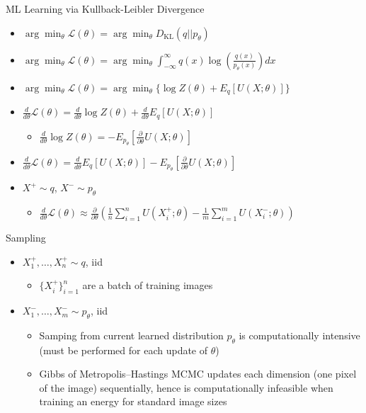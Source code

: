 \documentclass{beamer}
\begin{document}
\begin{frame}{ML Learning via Kullback-Leibler Divergence}
\begin{itemize}
\item $\arg\min_\theta\mathcal{L}(\theta)=\arg\min_\theta D_\text{KL}(q||p_\theta)$
\item $\arg\min_\theta\mathcal{L}(\theta)=\arg\min_\theta \int_{-\infty}^\infty q(x)\log(\frac{q(x)}{p_\theta(x)})dx$
\item $\arg\min_\theta\mathcal{L}(\theta)=\arg\min_\theta \{\log Z(\theta)+E_q[U(X;\theta)]\}$
\item $\frac{d}{d\theta}\mathcal{L}(\theta)=\frac{d}{d\theta}\log Z(\theta)+\frac{d}{d\theta}E_q[U(X;\theta)]$\begin{itemize}
\item $\frac{d}{d\theta}\log Z(\theta)=-E_{p_\theta}[\frac{\partial}{\partial\theta}U(X;\theta)]$\end{itemize}
\item $\frac{d}{d\theta}\mathcal{L}(\theta)=\frac{d}{d\theta}E_q[U(X;\theta)]-E_{p_\theta}[\frac{\partial}{\partial\theta}U(X;\theta)]$
\item $X^+\sim q$, $X^-\sim p_\theta$\begin{itemize}
\item $\frac{d}{d\theta}\mathcal{L}(\theta)\approx\frac{\partial}{\partial\theta}(\frac{1}{n}\sum_{i=1}^n U(X_i^+;\theta)-\frac{1}{m}\sum_{i=1}^m U(X_i^-;\theta))$\end{itemize}
\end{itemize}
\end{frame}
\begin{frame}{Sampling}
\begin{itemize}
\item $X_1^+,\dots,X_n^+\sim q$, iid
\begin{itemize}
\item $\{X_i^+\}_{i=1}^n$ are a batch of training images
\end{itemize}
\item $X_1^-,\dots,X_m^-\sim p_\theta$, iid
\begin{itemize}
\item Samping from current learned distribution $p_\theta$ is computationally intensive (must be performed for each update of $\theta$)
\item Gibbs of Metropolis–Hastings MCMC updates each dimension (one pixel of the image) sequentially, hence is computationally infeasible when training an energy for standard image sizes
\end{itemize}
\end{itemize}
\end{frame}
\end{document}

